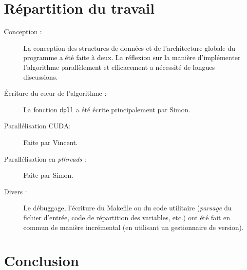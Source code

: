 \documentclass{article}
\newcommand{\code}[1]{\texttt{{#1}}}
\newcommand{\cuda}{\textsc{CUDA}}
\begin{document}
\section{Répartition du travail}
\begin{description}
    \item[Conception :] La conception des structures de données et de l'architecture globale du programme a été faite à deux. La réflexion sur la manière d'implémenter l'algorithme parallèlement et efficacement a nécessité de longues discussions.
    \item[Écriture du cœur de l'algorithme :] La fonction \code{dpll} a été écrite principalement par Simon.
    \item[Parallélisation \cuda :] Faite par Vincent.
    \item[Parallélisation en \emph{pthreads} :] Faite par Simon.
    \item[Divers :] Le débuggage, l'écriture du Makefile ou du code utilitaire (\emph{parsage} du fichier d'entrée, code de répartition des variables, etc.) ont été fait en commun de manière incrémental (en utilisant un gestionnaire de version).
\end{description}


\section{Conclusion}
\end{document}
